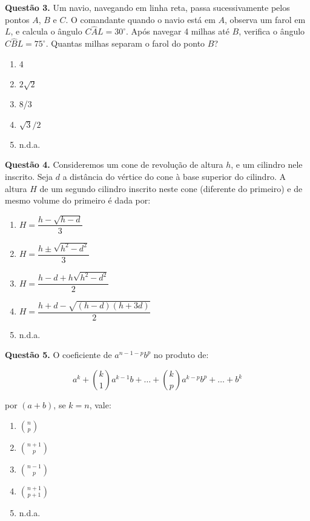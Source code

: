 \documentclass[11pt]{article}
\begin{document}
\textbf{Questão 3.} Um    navio,    navegando    em    linha    reta,    passa    sucessivamente  pelos  pontos  $A$,  $B$  e  $C$.  O  comandante  quando  o  navio  está  em  $A$,  observa  um  farol  em  $L$,  e  calcula  o  ângulo  $C\hat{A}L=  30^{\circ}$.  Após  navegar  4  milhas  até  $B$, verifica o ângulo $C\hat{B}L = 75^{\circ}$. Quantas milhas separam o farol do ponto $B$?

\begin{multicols}{5}
    \begin{enumerate}[\bf A (\quad)]
        \item 4
        \item $2\sqrt{2}$
        \item 8/3
        \item $\sqrt{3}/2$
        \item n.d.a.
    \end{enumerate}
\end{multicols}

\textbf{Questão 4.} Consideremos um cone de revolução de altura $h$, e um cilindro  nele  inscrito.  Seja  $d$  a  distância  do  vértice  do  cone  à  base  superior  do  cilindro.  A  altura  $H$  de  um  segundo   cilindro   inscrito   neste   cone   (diferente   do   primeiro) e de mesmo volume do primeiro é dada por: 

\begin{enumerate}[\bf A (\quad)]
    \item $H = \dfrac{h - \sqrt{h - d}}{3}$
    \item $H = \dfrac{h \pm \sqrt{h^2 - d^2}}{3}$
    \item $H = \dfrac{h - d + h\sqrt{h^2 - d^2}}{2}$
    \item $H = \dfrac{h + d - \sqrt{(h - d)(h + 3d)}}{2}$
    \item n.d.a.
\end{enumerate}

\textbf{Questão 5.} O coeficiente de $a^{n-1-p}b^p$ no produto de:

$$
a^k + \binom{k}{1}a^{k-1}b + \dots + \binom{k}{p}a^{k-p}b^p + \dots + b^k
$$

por $(a + b)$, se $k = n$, vale:

\begin{multicols}{3}
    \begin{enumerate}[\bf A (\quad)]
        \item $\binom{n}{p}$
        \item $\binom{n + 1}{p}$
        \item $\binom{n - 1}{p}$
        \item $\binom{n + 1}{p + 1}$
        \item n.d.a.
    \end{enumerate}
\end{multicols}
\end{document}
